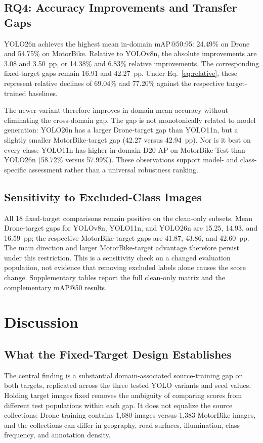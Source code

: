 \documentclass[conference,a4paper]{IEEEtran}
\begin{document}
\subsection{RQ4: Accuracy Improvements and Transfer Gaps}
YOLO26n achieves the highest mean in-domain mAP@50:95: 24.49\% on Drone and 54.75\% on MotorBike. Relative to YOLOv8n, the absolute improvements are 3.08 and 3.50~pp, or 14.38\% and 6.83\% relative improvements. The corresponding fixed-target gaps remain 16.91 and 42.27~pp. Under Eq.~\eqref{eq:relative}, these represent relative declines of 69.04\% and 77.20\% against the respective target-trained baselines.

The newer variant therefore improves in-domain mean accuracy without eliminating the cross-domain gap. The gap is not monotonically related to model generation: YOLO26n has a larger Drone-target gap than YOLO11n, but a slightly smaller MotorBike-target gap (42.27 versus 42.94~pp). Nor is it best on every class: YOLO11n has higher in-domain D20 AP on MotorBike Test than YOLO26n (58.72\% versus 57.99\%). These observations support model- and class-specific assessment rather than a universal robustness ranking.

\subsection{Sensitivity to Excluded-Class Images}
All 18 fixed-target comparisons remain positive on the clean-only subsets. Mean Drone-target gaps for YOLOv8n, YOLO11n, and YOLO26n are 15.25, 14.93, and 16.59~pp; the respective MotorBike-target gaps are 41.87, 43.86, and 42.60~pp. The main direction and larger MotorBike-target advantage therefore persist under this restriction. This is a sensitivity check on a changed evaluation population, not evidence that removing excluded labels alone causes the score change. Supplementary tables report the full clean-only matrix and the complementary mAP@50 results.

\section{Discussion}
\subsection{What the Fixed-Target Design Establishes}
The central finding is a substantial domain-associated source-training gap on both targets, replicated across the three tested YOLO variants and seed values. Holding target images fixed removes the ambiguity of comparing scores from different test populations within each gap. It does not equalize the source collections: Drone training contains 1,680 images versus 1,383 MotorBike images, and the collections can differ in geography, road surfaces, illumination, class frequency, and annotation density.
\end{document}
